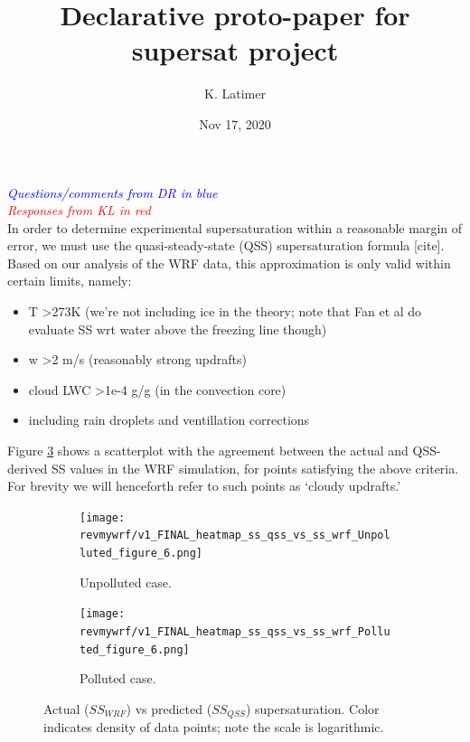 \documentclass{article}
\title{Declarative proto-paper for supersat project}
\author{K. Latimer}
\date{Nov 17, 2020}
\newcommand{\drcomm}[1]{\textcolor{blue}{\textit{#1}}}
\newcommand{\klcomm}[1]{\textcolor{red}{\textit{#1}}}
\begin{document}
\maketitle

\noindent\drcomm{Questions/comments from DR in blue} \\
\noindent\klcomm{Responses from KL in red}\\

In order to determine experimental supersaturation within a reasonable margin of error, we must use the quasi-steady-state (QSS) supersaturation formula [cite]. Based on our analysis of the WRF data, this approximation is only valid within certain limits, namely:
\begin{itemize}
	\item T \textgreater  273K (we're not including ice in the theory; note that Fan et al do evaluate SS wrt water above the freezing line though)
	\item w \textgreater  2 m/s (reasonably strong updrafts)
	\item cloud LWC \textgreater  1e-4 g/g (in the convection core)
	\item including rain droplets and ventillation corrections
\end{itemize}

Figure \ref{wrfvsqss} shows a scatterplot with the agreement between the actual and QSS-derived SS values in the WRF simulation, for points satisfying the above criteria. For brevity we will henceforth refer to such points as `cloudy updrafts.'

\clearpage
\newpage

\begin{figure}[ht]
	\centering
	\begin{subfigure}{0.7\textwidth}
		\texttt{[image: revmywrf/v1\_FINAL\_heatmap\_ss\_qss\_vs\_ss\_wrf\_Unpolluted\_figure\_6.png]}
		\caption{Unpolluted case.}
		\label{wrfvsqssunpoll}
	\end{subfigure}
	\begin{subfigure}{0.7\textwidth}
		\texttt{[image: revmywrf/v1\_FINAL\_heatmap\_ss\_qss\_vs\_ss\_wrf\_Polluted\_figure\_6.png]}
		\caption{Polluted case.}
		\label{wrfvsqsspoll}
	\end{subfigure}
	\caption{Actual ($SS_{WRF}$) vs predicted ($SS_{QSS}$) supersaturation. Color indicates density of data points; note the scale is logarithmic.}
	\label{wrfvsqss}
\end{figure}
\end{document}
